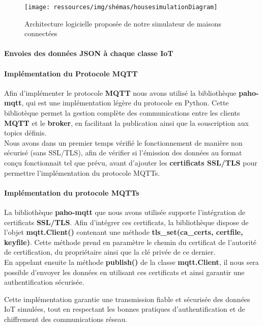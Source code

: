 \documentclass[10pt, a4paper]{report}
\begin{document}
	\begin{figure}[h!]
		\centering
		\texttt{[image: ressources/img/shémas/housesimulationDiagram]}
		\caption{Architecture logicielle proposée de notre simulateur de maisons connectées}
		\label{fig:archiMaisonConnectées}
	\end{figure}
	
	\paragraph{Envoies des données JSON à chaque classe IoT}

	\paragraph{Implémentation du Protocole MQTT\\} 
	Afin d'implémenter le protocole \textbf{MQTT} nous avons utilisé la bibliothèque \textbf{paho-mqtt}, qui est une implémentation légère du protocole en Python. Cette bibliotèque permet la gestion complète des communications entre les clients \textbf{MQTT} et le \textbf{broker}, en facilitant la publication ainsi que la souscription aux topics définis.\\
	Nous avons dans un premier temps vérifié le fonctionnement de manière non sécurisé (sans SSL/TLS), afin de vérifier si l'émission des données au format conçu fonctionnait tel que prévu, avant d'ajouter les \textbf{certificats SSL/TLS} pour permettre l'implémentation du protocole MQTTs. 

	
	\paragraph{Implémentation du protocole MQTTs\\} 
	La bibliothèque \textbf{paho-mqtt} que nous avons utilisée supporte l'intégration de certificats \textbf{SSL/TLS}. Afin d'intégrer ces certificats, la bibliothèque dispose de l'objet \textbf{mqtt.Client()} contenant une méthode \textbf{tls\_set(ca\_certs, certfile, keyfile)}. Cette méthode prend en paramètre le chemin du certificat de l'autorité de certification, du propriétaire ainsi que la clé privée de ce dernier.\\
	En appelant ensuite la méthode \textbf{publish()} de la classe \textbf{mqtt.Client}, il nous sera possible d'envoyer les données en utilisant ces certificats et ainsi garantir une authentification sécurisée.
	
	Cette implémentation garantie une transmission fiable et sécurisée des données IoT simulées, tout en respectant les bonnes pratiques d’authentification et de chiffrement des communications réseau.
	\newpage
	
\end{document}
